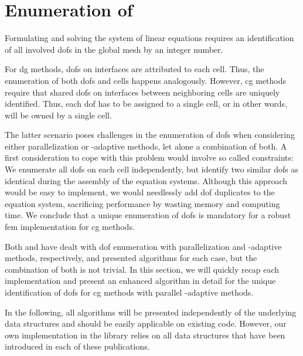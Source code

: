 \section{Enumeration of }
\label{sec:enumeration}

Formulating and solving the system of linear equations requires an identification of all involved \glspl{dof} in the global mesh by an integer number.

For \gls{dg} methods, \glspl{dof} on interfaces are attributed to each cell. Thus, the enumeration of both \glspl{dof} and cells happens analogously. However, \gls{cg} methods require that shared \glspl{dof} on interfaces between neighboring cells are uniquely identified. Thus, each \gls{dof} has to be assigned to a single cell, or in other words, will be owned by a single cell.


The latter scenario poses challenges in the enumeration of \glspl{dof} when considering either parallelization or \hp-adaptive methods, let alone a combination of both. A first consideration to cope with this problem would involve so called constraints: We enumerate all \glspl{dof} on each cell independently, but identify two similar \glspl{dof} as identical during the assembly of the equation systems. Although this approach would be easy to implement, we would needlessly add \gls{dof} duplicates to the equation system, sacrificing performance by wasting memory and computing time. We conclude that a unique enumeration of \glspl{dof} is mandatory for a robust \gls{fem} implementation for \gls{cg} methods.

Both \textcite{bangerth2012} and \textcite{bangerth2009} have dealt with \gls{dof} enumeration with parallelization and \hp-adaptive methods, respectively, and presented algorithms for each case, but the combination of both is not trivial. In this section, we will quickly recap each implementation and present an enhanced algorithm in detail for the unique identification of \glspl{dof} for \gls{cg} methods with parallel \hp-adaptive methods.

In the following, all algorithms will be presented independently of the underlying data structures and should be easily applicable on existing code. However, our own implementation in the \dealii{} library relies on all data structures that have been introduced in each of these publications.

